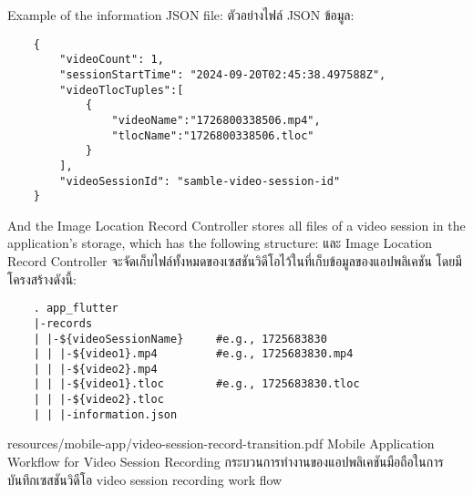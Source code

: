 \ifenglish
Example of the information JSON file:
\else
ตัวอย่างไฟล์ JSON ข้อมูล:
\fi
\begin{lstlisting}
    {
        "videoCount": 1,
        "sessionStartTime": "2024-09-20T02:45:38.497588Z",
        "videoTlocTuples":[
            {
                "videoName":"1726800338506.mp4",
                "tlocName":"1726800338506.tloc"
            }
        ],
        "videoSessionId": "samble-video-session-id"
    }
\end{lstlisting}

\ifenglish
And the Image Location Record Controller stores all files of a video session in the application's storage, which has the following structure:
\else
และ Image Location Record Controller จะจัดเก็บไฟล์ทั้งหมดของเซสชันวิดีโอไว้ในที่เก็บข้อมูลของแอปพลิเคชัน โดยมีโครงสร้างดังนี้:
\fi

\begin{lstlisting}
    . app_flutter
    |-records
    | |-${videoSessionName}     #e.g., 1725683830
    | | |-${video1}.mp4         #e.g., 1725683830.mp4
    | | |-${video2}.mp4
    | | |-${video1}.tloc        #e.g., 1725683830.tloc
    | | |-${video2}.tloc
    | | |-information.json
\end{lstlisting}

\insertPDFfigure
{resources/mobile-app/video-session-record-transition.pdf}
{\ifenglish Mobile Application Workflow for Video Session Recording \else กระบวนการทำงานของแอปพลิเคชันมือถือในการบันทึกเซสชันวิดีโอ \fi}
{video session recording work flow}
